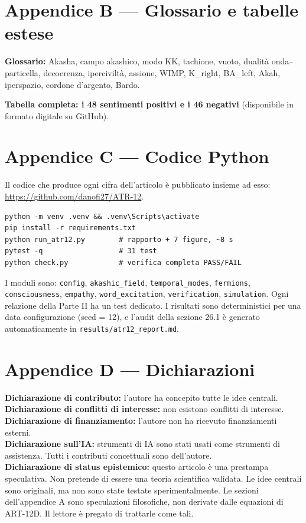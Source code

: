 \documentclass[11pt,a4paper]{article}
\begin{document}
\section{Appendice B --- Glossario e tabelle estese}
\textbf{Glossario:} Akasha, campo akashico, modo KK, tachione, vuoto, dualità onda--particella, decoerenza, iperciviltà, assione, WIMP, K\_right, BA\_left, Akah, iperspazio, cordone d'argento, Bardo.

\textbf{Tabella completa: i 48 sentimenti positivi e i 46 negativi} (disponibile in formato digitale su GitHub).

\section{Appendice C --- Codice Python}
Il codice che produce ogni cifra dell'articolo è pubblicato insieme ad esso: \url{https://github.com/danofi27/ATR-12}.

\begin{verbatim}
python -m venv .venv && .venv\Scripts\activate
pip install -r requirements.txt
python run_atr12.py        # rapporto + 7 figure, ~8 s
pytest -q                  # 31 test
python check.py            # verifica completa PASS/FAIL
\end{verbatim}

I moduli sono: \texttt{config}, \texttt{akashic\_field}, \texttt{temporal\_modes}, \texttt{fermions}, \texttt{consciousness}, \texttt{empathy}, \texttt{word\_excitation}, \texttt{verification}, \texttt{simulation}. Ogni relazione della Parte II ha un test dedicato. I risultati sono deterministici per una data configurazione (seed = 12), e l'audit della sezione 26.1 è generato automaticamente in \texttt{results/atr12\_report.md}.

\section{Appendice D --- Dichiarazioni}
\textbf{Dichiarazione di contributo:} l'autore ha concepito tutte le idee centrali. \\
\textbf{Dichiarazione di conflitti di interesse:} non esistono conflitti di interesse. \\
\textbf{Dichiarazione di finanziamento:} l'autore non ha ricevuto finanziamenti esterni. \\
\textbf{Dichiarazione sull'IA:} strumenti di IA sono stati usati come strumenti di assistenza. Tutti i contributi concettuali sono dell'autore. \\
\textbf{Dichiarazione di status epistemico:} questo articolo è una prestampa speculativa. Non pretende di essere una teoria scientifica validata. Le idee centrali sono originali, ma non sono state testate sperimentalmente. Le sezioni dell'appendice A sono speculazioni filosofiche, non derivate dalle equazioni di ART-12D. Il lettore è pregato di trattarle come tali.
\end{document}
